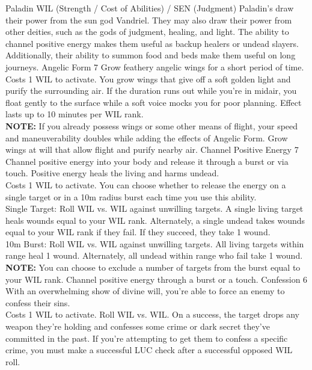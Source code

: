 ﻿\begin{path}
{Paladin}
{WIL (Strength / Cost of Abilities) / SEN (Judgment) }
{Paladin’s draw their power from the sun god Vandriel. They may also draw their power from other deities, such as the gods of judgment, healing, and light.}
{The ability to channel positive energy makes them useful as backup healers or undead slayers. Additionally, their ability to summon food and beds make them useful on long journeys.}
\skilldescription
{Angelic Form}
{7}
{Grow feathery angelic wings for a short period of time.
\\Costs 1 WIL to activate. You grow wings that give off a soft golden light and purify the surrounding air. If the duration runs out while you're in midair, you float gently to the surface while a soft voice mocks you for poor planning. Effect lasts up to 10 minutes per WIL rank.
\\\textbf{NOTE:} If you already possess wings or some other means of flight, your speed and maneuverability doubles while adding the effects of Angelic Form.}
{Grow wings at will that allow flight and purify nearby air.}
\skilldescription
{Channel Positive Energy}
{7}
{Channel positive energy into your body and release it through a burst or via touch. Positive energy heals the living and harms undead.
\\Costs 1 WIL to activate. You can choose whether to release the energy on a single target or in a 10m radius burst each time you use this ability.
\\Single Target: Roll WIL vs. WIL against unwilling targets. A single living target heals wounds equal to your WIL rank. Alternately, a single undead takes wounds equal to your WIL rank if they fail. If they succeed, they take 1  wound.
\\10m Burst: Roll WIL vs. WIL against unwilling targets. All living targets within range heal 1 wound. Alternately, all undead within range who fail take 1 wound.
\\\textbf{NOTE:} You can choose to exclude a number of targets from the burst equal to your WIL rank.}
{Channel positive energy through a burst or a touch.}
\skilldescription
{Confession}
{6}
{With an overwhelming show of divine will, you're able to force an enemy to confess their sins.
\\Costs 1 WIL to activate. Roll WIL vs. WIL. On a success, the target drops any weapon they're holding and confesses some crime or dark secret they've committed in the past. If you're attempting to get them to confess a specific crime, you must make a successful LUC check after a successful opposed WIL roll.}

\end{path}
